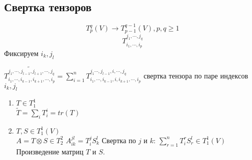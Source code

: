 \subsection{Свертка тензоров}
$$T_{p}^{q}(V) \to T^{q - 1}_{p - 1}(V), p, q \ge 1$$
$$T_{i_1, \cdots, i_p}^{j_1, \cdots, j_q}$$
Фиксируем $i_k, j_l$\\
\begin{Def}
$\widetilde{T_{i_1, \cdots, i_{k - 1}, i_{k + 1}, \cdots, i_p}^{j_1, \cdots, j_{l - 1}, j_{l + 1}, \cdots, j_q}} = \sum_{i = 1}^{n}T_{i_1, \cdots, i_{k - 1}, i, i_{k + 1}, \cdots, i_p}^{j_1\cdots, j_{l - 1}, i, \cdots, j_{q}}$
свертка тензора по паре индексов $i_k, j_l$\\
\end{Def}

\begin{exmp}
\begin{enumerate}
\item
$T \in T_{1}^{1}$\\
$\widetilde{T} = \sum_{i}T_{i}^{i} = tr(T)$  
\item
$T, S \in T_{1}^{1}(V)$\\
$A = T \otimes S \in T^2_2$
$A^{jl}_{ik} = T_i^jS_k^l$
Свертка по $j$ и $k$: $\sum_{r = 1}^{n}T_i^rS^l_r \in T^{1}_1(V)$
Произведение матриц $T$ и $S$.

\end{enumerate}
\end{exmp}